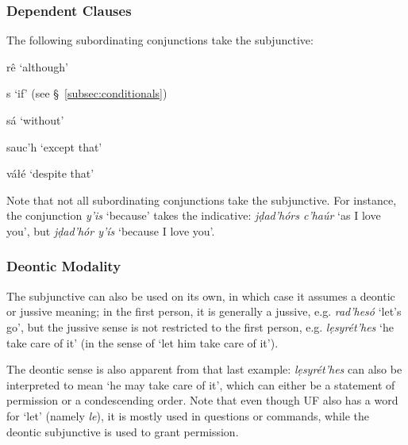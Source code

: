 \documentclass[a4paper, 12pt, twoside, final]{article}
\newlength{\EnumItemSep} \EnumItemSep-3pt
\newenvironment { dlist } [1] [{}] {
    \vspace { -.5em }
    \begingroup
    \def\descriptionlabel ##1 {\hspace\labelsep \normalfont #1 ##1}
    \settowidth \leftmargini { 99.\hskip\labelsep }
    \begin { description }
    \itemsep \EnumItemSep
} {
    \end { description }
    \endgroup
    \vspace { -.5em }
}
\let \w \textit
\begin{document}
\subsubsection{Dependent Clauses}
The following subordinating conjunctions take the subjunctive:
 {
\begin{dlist}[\bfseries\itshape]
    \item[rê] ‘although’
    \item[s] ‘if’ (see §~\ref{subsec:conditionals})
    \item[sá] ‘without’
    \item[sauc’h] ‘except that’
    \item[váłé] ‘despite that’
\end{dlist}
}

\noindent Note that not all subordinating conjunctions take the subjunctive. For instance, the conjunction \w{y’is}
‘because’ takes the indicative: \w{jḍad’hórs c’haúr} ‘as I love you’, but \w{jḍad’hór y’ís} ‘because I love you’.

\subsubsection{Deontic Modality}
The subjunctive can also be used on its own, in which case it assumes a deontic or jussive meaning;
in the first person, it is generally a jussive, e.g. \w{rad’hesó} ‘let’s go’, but the jussive sense is not restricted
to the first person, e.g. \w{lẹsyrét’hes} ‘he take care of it’ (in the sense of ‘let him take care of it’).

The deontic sense is also apparent from that last example: \w{lẹsyrét’hes} can also be interpreted to mean ‘he
may take care of it’, which can either be a statement of permission or a condescending order. Note that even
though UF also has a word for ‘let’ (namely \w{le}), it is mostly used in questions or commands, while the
deontic subjunctive is used to grant permission.
\end{document}
